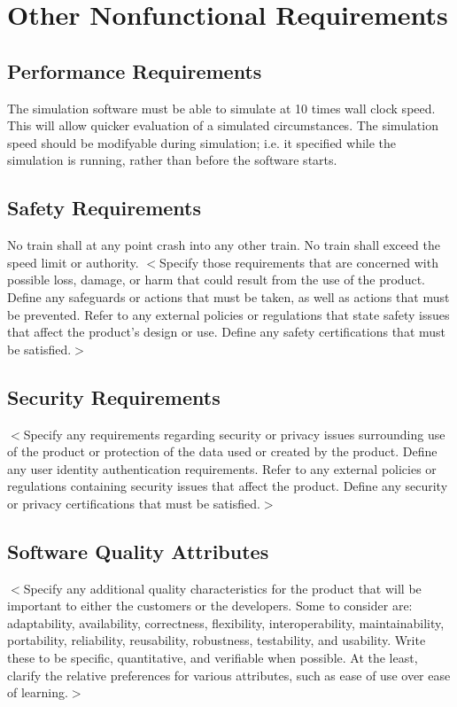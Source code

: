 \documentclass{scrreprt}
\begin{document}
\chapter{Other Nonfunctional Requirements}

\section{Performance Requirements}
The simulation software must be able to simulate at 10 times wall clock speed.
This will allow quicker evaluation of a simulated circumstances. The simulation
speed should be modifyable during simulation; i.e. it specified while the simulation
is running, rather than before the software starts.

\section{Safety Requirements}
No train shall at any point crash into any other train. No train shall exceed
the speed limit or authority.
$<$Specify those requirements that are concerned with possible loss, damage, or 
harm that could result from the use of the product. Define any safeguards or 
actions that must be taken, as well as actions that must be prevented. Refer to 
any external policies or regulations that state safety issues that affect the 
product’s design or use. Define any safety certifications that must be 
satisfied.$>$

\section{Security Requirements}
$<$Specify any requirements regarding security or privacy issues surrounding use 
of the product or protection of the data used or created by the product. Define 
any user identity authentication requirements. Refer to any external policies or 
regulations containing security issues that affect the product. Define any 
security or privacy certifications that must be satisfied.$>$

\section{Software Quality Attributes}
$<$Specify any additional quality characteristics for the product that will be 
important to either the customers or the developers. Some to consider are: 
adaptability, availability, correctness, flexibility, interoperability, 
maintainability, portability, reliability, reusability, robustness, testability, 
and usability. Write these to be specific, quantitative, and verifiable when 
possible. At the least, clarify the relative preferences for various attributes, 
such as ease of use over ease of learning.$>$
\end{document}
